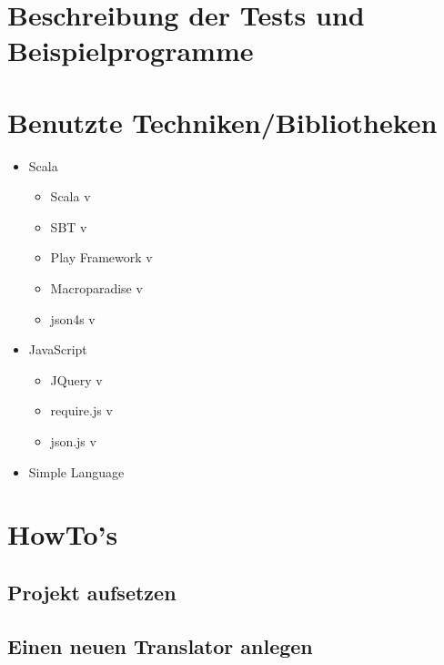 \documentclass[12pt,bibtotoc]{scrreprt}
\begin{document}
\chapter{Beschreibung der Tests und Beispielprogramme}
\label{chap:tests-and-examples}


\chapter{Benutzte Techniken/Bibliotheken}

\begin{itemize}
  \item{Scala}
  \begin{itemize}
    \item{Scala v}
    \item{SBT v}
    \item{Play Framework v}
    \item{Macroparadise v}
    \item{json4s v}
  \end{itemize}
  \item{JavaScript}
  \begin{itemize}
    \item{JQuery v}
    \item{require.js v}
    \item{json.js v}
  \end{itemize}
  \item{Simple Language}
\end{itemize}



\chapter{HowTo's}

\section{Projekt aufsetzen}
\label{sec:setup-project}

\section{Einen neuen Translator anlegen}
\label{sec:new-translator-class}

{}

\end{document}
